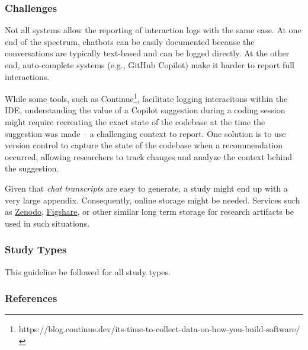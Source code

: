 \subsubsection{Challenges}



Not all systems allow the reporting of interaction logs with the same ease. At one end of the spectrum, chatbots can be easily documented because the conversations are typically text-based and can be logged directly. At the other end, auto-complete systems (e.g., GitHub Copilot) make it harder to report full interactions. 


While some tools, such as Continue\footnote{https://blog.continue.dev/its-time-to-collect-data-on-how-you-build-software/}, facilitate logging interacitons within the IDE, understanding the value of a Copilot suggestion during a coding session might require recreating the exact state of the codebase at the time the suggestion was made -- a challenging context to report. One solution is to use version control to capture the state of the codebase when a recommendation occurred, allowing researchers to track changes and analyze the context behind the suggestion.



Given that {\em chat transcripts} are easy to generate, a study might end up with a very large appendix. Consequently, online storage might be needed. Services such as \href{https://zenodo.org}{Zenodo}, \href{https://figshare.com/}{Figshare}, or other similar long term storage for research artifacts \should be used in such situations.




\subsubsection{Study Types}

This guideline \should be followed for all study types. 


\subsubsection{References}





